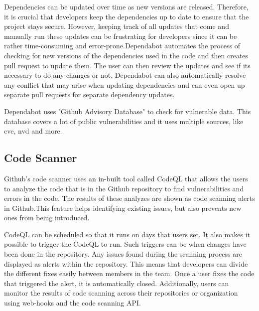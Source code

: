 Dependencies can be updated over time as new versions are released. Therefore, it is crucial that developers keep the dependencies up to date to ensure that the project stays secure. However, keeping track of all updates that come and manually run these updates can be frustrating for developers since it can be rather time-consuming and error-prone.Dependabot automates the process of checking for new versions of the dependencies used in the code and then creates pull request to update them. The user can then review the updates and see if its necessary to do any changes or not. 
Dependabot can also automatically resolve any conflict that may arise when updating dependencies and can even open up separate pull requests for separate dependency updates.  \cite{GithubDependabot2}

Dependabot uses "Github Advisory Database" to check for vulnerable data. This database covers a lot of public vulnerabilities and it uses multiple sources, like \acrlong{cve}, \acrlong{nvd} and more. \cite{GithubDependabot1}

\subsection{Code Scanner}
Github's code scanner uses an in-built tool called CodeQL that allows the users to analyze the code that is in the Github repository to find vulnerabilities and errors in the code. The results of these analyzes are shown as code scanning alerts in Github.This feature helps identifying existing issues, but also prevents new ones from being introduced. \cite{CodeQL}

CodeQL can be scheduled so that it runs on days that users set. It also makes it possible to trigger the CodeQL to run. Such triggers can be when changes have been done in the repository. 
 Any issues found during the scanning process are displayed as alerts within the repository. This means that developers can divide the different fixes easily between members in the team.  Once a user fixes the code that triggered the alert, it is automatically closed. Additionally, users can monitor the results of code scanning across their repositories or organization using web-hooks and the code scanning API. 
\cite{GithubCodeScanning}




